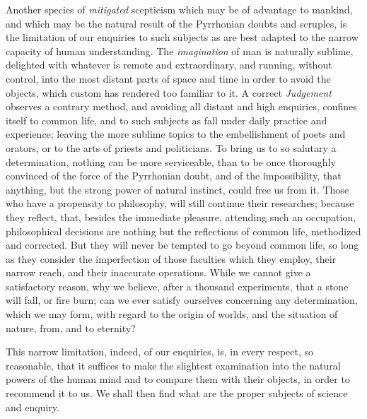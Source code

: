 \documentclass[]{article}
\begin{document}
\begin{sectionbody}
\humeparagraph  Another species of \emph{mitigated} scepticism which may be of advantage to mankind, and which may be the natural result of the Pyrrhonian doubts and scruples, is the limitation of our enquiries to such subjects as are best adapted to the narrow capacity of human understanding. The \emph{imagination} of man is naturally sublime, delighted with whatever is remote and extraordinary, and running, without control, into the most distant parts of space and time in order to avoid the objects, which custom has rendered too familiar to it. A correct \emph{Judgement} observes a contrary method, and avoiding all distant and high enquiries, confines itself to common life, and to such subjects as fall under daily practice and experience; leaving the more sublime topics to the embellishment of poets and orators, or to the arts of priests and politicians. To bring us to so salutary a determination, nothing can be more serviceable, than to be once thoroughly convinced of the force of the Pyrrhonian doubt, and of the impossibility, that anything, but the strong power of natural instinct, could free us from it. Those who have a propensity to philosophy, will still continue their researches; because they reflect, that, besides the immediate pleasure, attending such an occupation, philosophical decisions are nothing but the reflections of common life, methodized and corrected. But they will never be tempted to go beyond common life, so long as they consider the imperfection of those faculties which they employ, their narrow reach, and their inaccurate operations. While we cannot give a satisfactory reason, why we believe, after a thousand experiments, that a stone will fall, or fire burn; can we ever satisfy ourselves concerning any determination, which we may form, with regard to the origin of worlds, and the situation of nature, from, and to eternity?

\humeparagraph  This narrow limitation, indeed, of our enquiries, is, in every respect, so reasonable, that it suffices to make the slightest examination into the natural powers of the human mind and to compare them with their objects, in order to recommend it to us. We shall then find what are the proper subjects of science and enquiry.


\end{sectionbody}
\end{document}
